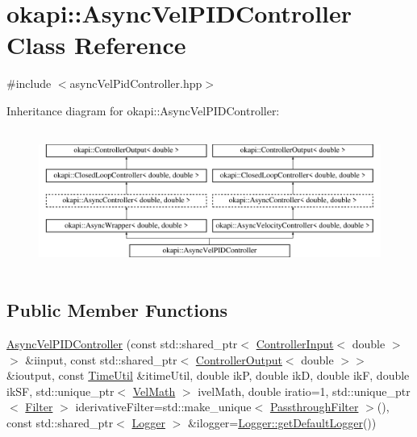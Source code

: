 \hypertarget{classokapi_1_1AsyncVelPIDController}{}\section{okapi\+::Async\+Vel\+P\+I\+D\+Controller Class Reference}
\label{classokapi_1_1AsyncVelPIDController}


{\ttfamily \#include $<$async\+Vel\+Pid\+Controller.\+hpp$>$}

Inheritance diagram for okapi\+::Async\+Vel\+P\+I\+D\+Controller\+:\begin{figure}[H]
\begin{center}
\leavevmode
\includegraphics[height=4.620462cm]{classokapi_1_1AsyncVelPIDController}
\end{center}
\end{figure}
\subsection*{Public Member Functions}
\begin{DoxyCompactItemize}
\item 
\mbox{\hyperlink{classokapi_1_1AsyncVelPIDController_af1f3d7f4b31514ca97500265f5e3295e}{Async\+Vel\+P\+I\+D\+Controller}} (const std\+::shared\+\_\+ptr$<$ \mbox{\hyperlink{classokapi_1_1ControllerInput}{Controller\+Input}}$<$ double $>$$>$ \&iinput, const std\+::shared\+\_\+ptr$<$ \mbox{\hyperlink{classokapi_1_1ControllerOutput}{Controller\+Output}}$<$ double $>$$>$ \&ioutput, const \mbox{\hyperlink{classokapi_1_1TimeUtil}{Time\+Util}} \&itime\+Util, double ikP, double ikD, double ikF, double ik\+SF, std\+::unique\+\_\+ptr$<$ \mbox{\hyperlink{classokapi_1_1VelMath}{Vel\+Math}} $>$ ivel\+Math, double iratio=1, std\+::unique\+\_\+ptr$<$ \mbox{\hyperlink{classokapi_1_1Filter}{Filter}} $>$ iderivative\+Filter=std\+::make\+\_\+unique$<$ \mbox{\hyperlink{classokapi_1_1PassthroughFilter}{Passthrough\+Filter}} $>$(), const std\+::shared\+\_\+ptr$<$ \mbox{\hyperlink{classokapi_1_1Logger}{Logger}} $>$ \&ilogger=\mbox{\hyperlink{classokapi_1_1Logger_a5053cf778b4b55acba788a3797dc96d2}{Logger\+::get\+Default\+Logger}}())
\end{DoxyCompactItemize}
